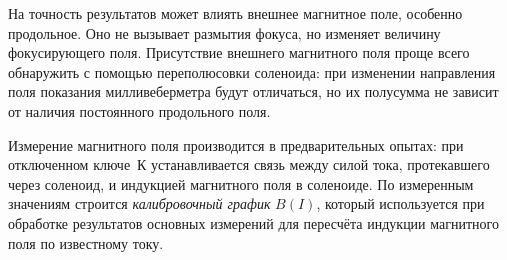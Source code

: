 На точность результатов может влиять внешнее магнитное поле, особенно
продольное. Оно не вызывает размытия фокуса, но изменяет величину фокусирующего
поля. Присутствие внешнего магнитного поля проще всего обнаружить с помощью
переполюсовки соленоида: при изменении направления поля показания
милливеберметра будут отличаться, но их полусумма не зависит от наличия
постоянного продольного поля.

Измерение магнитного поля производится в предварительных опытах: 
при отключенном ключе~К устанавливается связь между силой тока, протекавшего через
соленоид, и индукцией магнитного поля в соленоиде. 
По измеренным значениям строится \emph{калибровочный график} $B(I)$, 
который используется при обработке результатов
основных измерений для пересчёта индукции магнитного поля по известному току.

